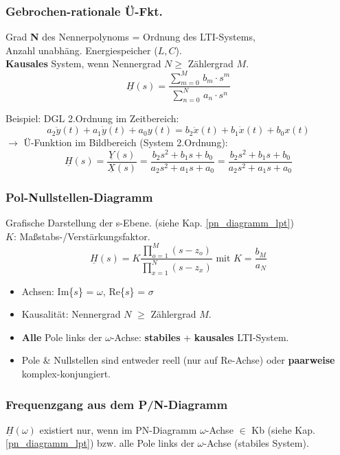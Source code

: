 \subsubsection{Gebrochen-rationale Ü-Fkt.}
{\small Grad \textbf{N} des Nennerpolynoms = Ordnung des LTI-Systems, \\ Anzahl unabhäng. Energiespeicher ($L, C$).\\
\textbf{Kausales} System, wenn Nennergrad $N\ge$ Z\"ahlergrad $M$}.
\[
\underline{H}(s)=\frac{\sum_{m=0}^{M} \, b_{m} \cdot s^{m}}{\sum_{n=0}^{N} \, a_{n} \cdot s^{n}}
\]

Beispiel: DGL 2.Ordnung im Zeitbereich:
\[
a_2\ddot{y}(t)+a_1\dot{y}(t)+a_0 y(t)=b_2\ddot{x}(t)+b_1\dot{x}(t)+b_0 x(t)
\]
$\rightarrow$ Ü-Funktion im Bildbereich (System 2.Ordnung):
\[
\underline{H}(s)=\frac{\underline{Y}(s)}{\underline{X}(s)}=\frac{b_2 s^2+b_1 s+b_0}{a_2 s^2 +a_1 s +a_0}
=\frac{b_2 s^2+b_1 s+b_0}{a_2 s^2 +a_1 s +a_0}
\]
\subsubsection{Pol-Nullstellen-Diagramm}\label{pn_diagramm_systeme}
{\small Grafische Darstellung der s-Ebene. (siehe Kap. \ref{pn_diagramm_lpt})\\
$K$: Maßstabs-/Verstärkungsfaktor.}
	\[
	 \underline{H}(s) = K \frac{\prod_{o=1}^{M} (s-z_o)}{\prod_{x=1}^{N} (s-z_x)} \text{ mit } K=\frac{b_M}{a_N}
	\]
\begin{itemize}
\item Achsen: Im\{$s$\} = $\omega$, \quad Re\{$s$\} = $\sigma$
\item Kausalität: Nennergrad $N$ $\ge$ Zählergrad $M$.
\item \textbf{Alle} Pole links der $\omega$-Achse: \textbf{stabiles} + \textbf{kausales} LTI-System.
\item Pole \& Nullstellen sind entweder reell (nur auf Re-Achse) oder \textbf{paarweise} komplex-konjungiert.
\end{itemize}
\subsubsection{Frequenzgang aus dem P/N-Diagramm}\label{fgang_pn}
      \small{$\underline{H}(\omega)$ existiert nur, wenn im PN-Diagramm $\omega$-Achse $\in$ Kb (siehe Kap. \ref{pn_diagramm_lpt}) bzw. alle Pole links der $\omega$-Achse (stabiles System).} \\
      

